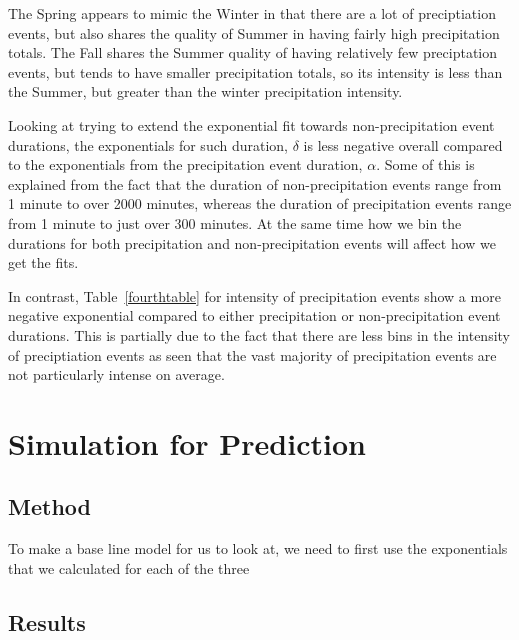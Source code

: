 \documentclass[11pt]{report}
\begin{document}
The Spring appears to mimic the Winter in that there are a lot of
preciptiation events, but also shares the quality of Summer in having
fairly high precipitation totals. The Fall shares the Summer quality
of having relatively few preciptation events, but tends to have
smaller precipitation totals, so its intensity is less than the
Summer, but greater than the winter precipitation intensity.
 

Looking at trying to extend the exponential fit towards non-precipitation
event durations, the exponentials for such duration, $\delta$ is less
negative overall compared to the exponentials from the precipitation event
duration, $\alpha$. Some of this is explained from the fact that the
duration of non-precipitation events range from 1 minute to over 2000
minutes, whereas the duration of precipitation events range from 1 minute to
just over 300 minutes. At the same time how we bin the durations for both
precipitation and non-precipitation events will affect how we get the fits.






In contrast, Table~\ref{fourthtable} for intensity of precipitation events
show a more negative exponential compared to either precipitation or
non-precipitation event durations. This is partially due to the fact that
there are less bins in the intensity of preciptiation events as seen that
the vast majority of precipitation events are not particularly intense on
average.

\clearpage

\section{Simulation for Prediction}\label{sec:sfp}

\subsection{Method}\label{sec:sfp}
To make a base line model for us to look at, we need to first use the exponentials that we calculated for each of the three 

\clearpage 

\subsection{Results}\label{sec:sfp}
\end{document}
